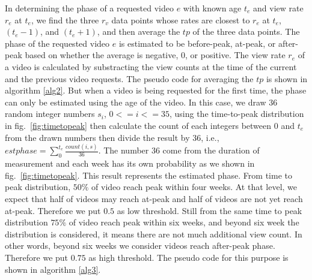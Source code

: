 \documentclass[10pt,final,journal,a4paper]{IEEEtran}
\begin{document}
In determining the phase of a requested video $e$ with known age $t_e$ and view rate $r_e$ at $t_e$, we find the three $r_v$ data points whose rates are closest to $r_e$ at $t_e$, $(t_e - 1)$, and $(t_e + 1)$, and then average the $tp$ of the three data points.
The phase of the requested video $e$ is estimated to be before-peak, at-peak, or after-peak based on whether the average is negative, $0$, or positive.
The view rate $r_e$ of a video is calculated by substracting the view counts at the time of the current and the previous video requests.
The pseudo code for averaging the $tp$ is shown in algorithm \ref{alg2}.
But when a video is being requested for the first time, the phase can only be estimated using the age of the video.
In this case, we draw 36 random integer numbers $s_i$, $0 <= i <= 35$,  using the time-to-peak distribution in fig.~\ref{fig:timetopeak} then calculate the count of each integers between $0$ and $t_e$ from the drawn numbers then divide the result by 36, 
i.e., $estphase = \sum_{0}^{t_e} \frac{count(i,s)}{36}$.
The number 36 come from the duration of measurement and each week has its own probability as we shown in fig.~\ref{fig:timetopeak}.
This result represents the estimated phase. 
From time to peak distribution, $50\%$ of video reach peak within four weeks. 
At that level, we expect that half of videos may reach at-peak and half of videos are not yet reach at-peak.
Therefore we put $0.5$ as low threshold.  
Still from the same time to peak distribution $75\%$ of video reach peak within six weeks, and beyond six week the distribution is considered, it means there are not much additional view count. 
In other words, beyond six weeks we consider videos reach after-peak phase. 
Therefore we put $0.75$ as high threshold.
The pseudo code for this purpose is shown in algorithm \ref{alg3}.

\end{document}
